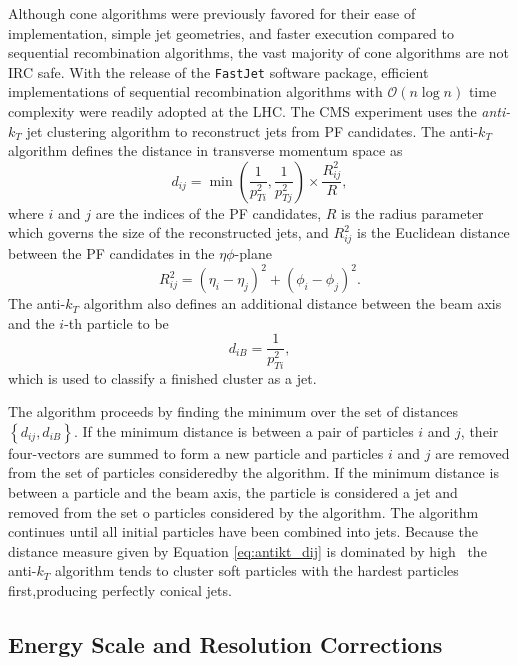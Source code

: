 Although cone algorithms were previously favored for their ease of implementation, simple jet geometries, and faster execution compared to sequential recombination algorithms, the vast majority of cone algorithms are not IRC safe. With the release of the \texttt{FastJet}\cite{FASTJET} software package, efficient implementations of sequential recombination algorithms with $\mathcal{O}(n \log n)$ time complexity were readily adopted at the LHC. The CMS experiment uses the \textit{anti-$k_{T}$} jet clustering algorithm\cite{ANTIKT} to reconstruct jets from PF candidates. The anti-$k_{T}$ algorithm defines the distance in transverse momentum space as
\begin{equation}
  d_{ij} = \min \left( \frac{1}{p_{Ti}^{2}}, \frac{1}{p_{Tj}^{2}} \right) \times \frac{R_{ij}^{2}}{R},
  \label{eq:antikt_dij}
\end{equation}
where $i$ and $j$ are the indices of the PF candidates, $R$ is the radius parameter which governs the size of the reconstructed jets, and $R_{ij}^{2}$ is the Euclidean distance between the PF candidates in the $\eta\phi$-plane
\begin{equation}
  R_{ij}^{2} = \left( \eta_{i} - \eta_{j} \right)^{2} + \left( \phi_{i} - \phi_{j} \right)^{2}.
  \label{eq:deltaR2}
\end{equation}
The anti-$k_{T}$ algorithm also defines an additional distance between the beam axis and the $i$-th particle to be
\begin{equation}
  d_{iB} = \frac{1}{p_{Ti}^{2}},
  \label{eq:antikt_diB}
\end{equation}
which is used to classify a finished cluster as a jet.

The algorithm proceeds by finding the minimum over the set of distances $\left\{ d_{ij}, d_{iB} \right\}$. If the minimum distance is between a pair of particles $i$ and $j$, their four-vectors are summed to form a new particle and particles $i$ and $j$ are removed from the set of particles consideredby the algorithm. If the minimum distance is between a particle and the beam axis, the particle is considered a jet and removed from the set o particles considered by the algorithm. The algorithm continues until all initial particles have been combined into jets. Because the distance measure given by Equation \ref{eq:antikt_dij} is dominated by high \pT\, the anti-$k_{T}$ algorithm tends to cluster soft particles with the hardest particles first,producing perfectly conical jets.

\subsection{Energy Scale and Resolution Corrections}

